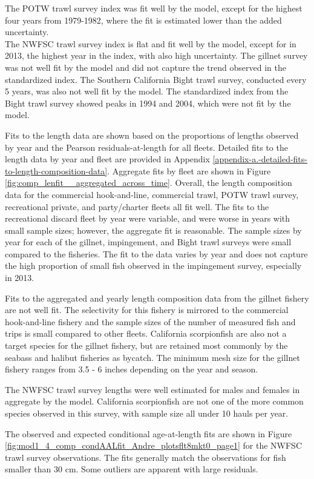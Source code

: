 \documentclass[12pt,]{article}
\begin{document}
The POTW trawl survey index was fit well by the model, except for the
highest four years from 1979-1982, where the fit is estimated lower than
the added uncertainty.\\
The NWFSC trawl survey index is flat and fit well by the model, except
for in 2013, the highest year in the index, with also high uncertainty.
The gillnet survey was not well fit by the model and did not capture the
trend observed in the standardized index. The Southern California Bight
trawl survey, conducted every 5 years, was also not well fit by the
model. The standardized index from the Bight trawl survey showed peaks
in 1994 and 2004, which were not fit by the model.

Fits to the length data are shown based on the proportions of lengths
observed by year and the Pearson residuals-at-length for all fleets.
Detailed fits to the length data by year and fleet are provided in
Appendix \ref{appendix-a.-detailed-fits-to-length-composition-data}.
Aggregate fits by fleet are shown in Figure
\ref{fig:comp_lenfit__aggregated_across_time}. Overall, the length
composition data for the commercial hook-and-line, commercial trawl,
POTW trawl survey, recreational private, and party/charter fleets all
fit well. The fits to the recreational discard fleet by year were
variable, and were worse in years with small sample sizes; however, the
aggregate fit is reasonable. The sample sizes by year for each of the
gillnet, impingement, and Bight trawl surveys were small compared to the
fisheries. The fit to the data varies by year and does not capture the
high proportion of small fish observed in the impingement survey,
especially in 2013.

Fits to the aggregated and yearly length composition data from the
gillnet fishery are not well fit. The selectivity for this fishery is
mirrored to the commercial hook-and-line fishery and the sample sizes of
the number of measured fish and trips is small compared to other fleets.
California scorpionfish are also not a target species for the gillnet
fishery, but are retained most commonly by the seabass and halibut
fisheries as bycatch. The minimum mesh size for the gillnet fishery
ranges from 3.5 - 6 inches depending on the year and season.

The NWFSC trawl survey lengths were well estimated for males and females
in aggregate by the model. California scorpionfish are not one of the
more common species observed in this survey, with sample size all under
10 hauls per year.

The observed and expected conditional age-at-length fits are shown in
Figure \ref{fig:mod1_4_comp_condAALfit_Andre_plotsflt8mkt0_page1} for
the NWFSC trawl survey observations. The fits generally match the
observations for fish smaller than 30 cm. Some outliers are apparent
with large residuals.
\end{document}
